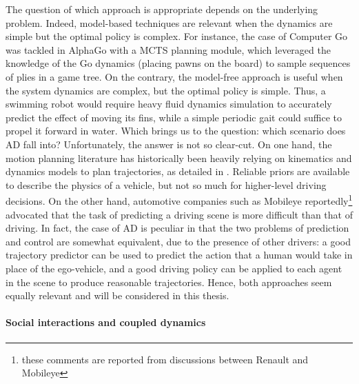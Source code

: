 The question of which approach is appropriate depends on the underlying problem. Indeed, model-based techniques are relevant when the dynamics are simple but the optimal policy is complex. For instance, the case of Computer Go was tackled in AlphaGo \citep{Silver2016,Silver2017,Silver2018} with a \ac{MCTS} planning module, which leveraged the knowledge of the Go dynamics (placing pawns on the board) to sample sequences of plies in a game tree. On the contrary, the model-free approach is useful when the system dynamics are complex, but the optimal policy is simple. Thus, a swimming robot would require heavy fluid dynamics simulation to accurately predict the effect of moving its fins, while a simple periodic gait could suffice to propel it forward in water. Which brings us to the question: which scenario does \ac*{AD} fall into? Unfortunately, the answer is not so clear-cut. On one hand, the motion planning literature has historically been heavily relying on kinematics and dynamics models to plan trajectories, as detailed in . Reliable priors are available to describe the physics of a vehicle, but not so much for higher-level driving decisions. On the other hand, automotive companies such as Mobileye reportedly\footnote{these comments are reported from discussions between Renault and Mobileye} advocated that the task of predicting a driving scene is more difficult than that of driving. In fact, the case of \acl*{AD} is peculiar in that the two problems of prediction and control are somewhat equivalent, due to the presence of other drivers: a good trajectory predictor can be used to predict the action that a human would take in place of the ego-vehicle, and a good driving policy can be applied to each agent in the scene to produce reasonable trajectories. Hence, both approaches seem equally relevant and will be considered in this thesis.

\paragraph{Social interactions and coupled dynamics}

